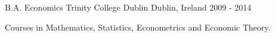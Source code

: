 \begin{cventries}
  \cventry
    {B.A. Economics}
    {Trinity College Dublin}
    {Dublin, Ireland}
    {2009 - 2014}
    {
      \begin{cvitems}
      \item {Courses in Mathematics, Statistics, Econometrics and Economic Theory.}
      \end{cvitems}
    }
\end{cventries}



